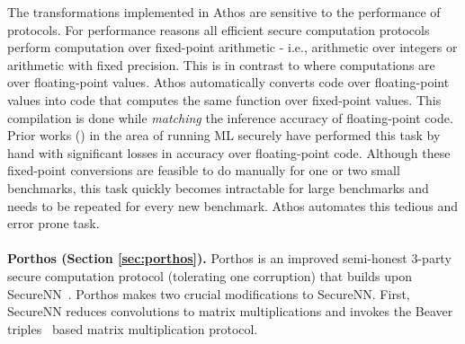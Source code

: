 The transformations implemented in Athos are sensitive to the performance of \mpc protocols. 
 For performance reasons all efficient secure computation protocols perform computation over fixed-point arithmetic - i.e., arithmetic over integers or arithmetic with fixed precision. This is in contrast to \tensorflow where computations are over floating-point values. Athos automatically converts \tensorflow code over floating-point values into code that computes the same function over fixed-point values. This compilation is done while {\em matching} the inference accuracy of floating-point code. 
Prior works (\cite{secureml,minionn,gazelle,aby3,securenn,delphi}) in the area of running ML securely have performed this task by hand with significant losses in accuracy over floating-point code.
 Although these fixed-point conversions are feasible to do manually for one or two small benchmarks, this task quickly becomes intractable for large benchmarks and needs to be repeated for every new benchmark. Athos automates this tedious and error prone task.
\\\\
\noindent\textbf{Porthos (Section \ref{sec:porthos}).} 
Porthos is an improved semi-honest 3-party secure computation protocol (tolerating one corruption) that builds upon SecureNN~\cite{securenn}. 
Porthos makes two crucial modifications to SecureNN. 
First, SecureNN reduces convolutions  to matrix multiplications and  invokes the Beaver triples~\cite{beaver} based matrix multiplication protocol. 
